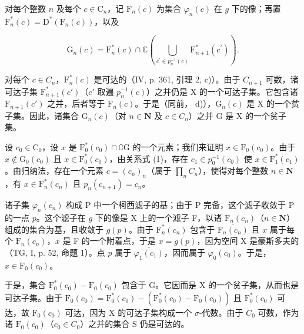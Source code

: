 对每个整数 \(n\) 及每个 \(c \in \mathrm{C}_n\)，记 \(\mathrm{F}_n(c)\) 为集合 \(\varphi_n(c)\) 在 \(g\) 下的像；再置 \(\mathrm{F}_n^*(c) = \mathrm{D}^*(\mathrm{F}_n(c))\)，以及

\[
\mathrm{G} _ {n} (c) = \mathrm{F} _ {n} ^ {*} (c) \cap \mathbb {C} \left(\bigcup_ {c ^ {\prime} \in p _ {n} ^ {- 1} (c)} \mathrm{F} _ {n + 1} ^ {*} (c ^ {\prime})\right).\tag{1}
\]

对每个 \(c \in C_{n}\)，\(\mathrm{F}_{n}^{*}(c)\) 是可达的（IV, p. 361, 引理 2, c)）。由于 \(C_{n+1}\) 可数，诸可达子集 \(\mathrm{F}_{n+1}^{*}(c')\)（\(c'\) 取遍 \(p_{n}^{-1}(c)\)）之并仍是 X 的一个可达子集。它包含诸 \(\mathrm{F}_{n+1}(c')\) 之并，后者等于 \(\mathrm{F}_{n}(c)\)。于是（同前， d)），\(\mathrm{G}_{n}(c)\) 是 X 的一个贫子集。因此，诸集合 \(\mathrm{G}_{n}(c)\)（对 \(n \in \mathbf{N}\) 及 \(c \in C_{n}\)）之并 G 是 X 的一个贫子集。

设 \(c_0 \in \mathrm{C}_0\)，设 \(x\) 是 \(\mathrm{F}_0^*(c_0) \cap \complement \mathrm{G}\) 的一个元素；我们来证明 \(x \in \mathrm{F}_0(c_0)\)。由于 \(x \notin \mathrm{G}_0(c_0)\) 且 \(x \in \mathrm{F}_0^*(c_0)\)，由关系式 (1)，存在 \(c_1 \in p_0^{-1}(c_0)\) 使 \(x \in \mathrm{F}_1^*(c_1)\)。由归纳法，存在一个元素 \(c = (c_n)_n\)（属于 \(\prod_n C_n\)），使得对每个整数 \(n \in \mathbf{N}\)，有 \(x \in \mathrm{F}_n^*(c_n)\) 且 \(p_n(c_{n+1}) = c_n\)。

诸子集 \(\varphi_n(c_n)\) 构成 P 中一个柯西滤子的基；由于 P 完备，这个滤子收敛于 P 的一点 \(p\)。这个滤子在 \(g\) 下的像是 X 上的一个滤子 F，以诸 \(\mathrm{F}_n(c_n)\)（\(n\in \mathbf{N}\)）组成的集合为基，且收敛于 \(g(p)\)。由于 \(\mathrm{F}_n^* (c_n)\) 包含于 \(\overline{\mathrm{F}_n(c_n)}\) 且 \(x\) 属于每个 \(\mathrm{F}_n(c_n)\)，\(x\) 是 F 的一个附着点，于是 \(x = g(p)\)，因为空间 X 是豪斯多夫的（TG, I, p. 52, 命题 1）。点 \(p\) 属于 \(\overline{\varphi_1(c_1)}\)，因而属于 \(\varphi_0(c_0)\)。于是，\(x\in \mathrm{F}_0(c_0)\)。

于是，集合 \(\mathrm{F}_{0}^{*}(c_{0}) - \mathrm{F}_{0}(c_{0})\) 包含于 G。它因而是 X 的一个贫子集，从而也是可达子集。由于 \(\mathrm{F}_{0}(c_{0}) = \mathrm{F}_{0}^{*}(c_{0}) - (\mathrm{F}_{0}^{*}(c_{0}) - \mathrm{F}_{0}(c_{0}))\) 且 \(\mathrm{F}_{0}^{*}(c_{0})\) 可达，故 \(\mathrm{F}_{0}(c_{0})\) 可达，因为 X 的可达子集构成一个 \(\sigma\)-代数。由于 \(C_{0}\) 可数，作为诸 \(\mathrm{F}_{0}(c_{0})\)（\(c_{0} \in C_{0}\)）之并的集合 S 仍是可达的。

